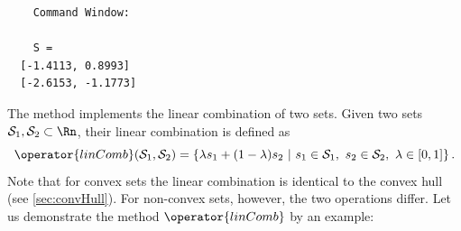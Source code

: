 \begin{center}
\begin{minipage}[t]{0.40\textwidth}
	\vspace{10pt}
	\footnotesize
	
\end{minipage}
\begin{minipage}[t]{0.25\textwidth}
	\vspace{10pt}

	\begin{verbatim}
	Command Window:
		
	S = 
  [-1.4113, 0.8993]
  [-2.6153, -1.1773]
	\end{verbatim}
\end{minipage}
\begin{minipage}[t]{0.3\textwidth}
	\vspace{0pt}
	\centering
\end{minipage}
\end{center}

\vspace{1cm}

\label{sec:linComb}

The method  implements the linear combination of two sets. Given two sets $\mathcal{S}_1,\mathcal{S}_2 \subset \Rn$, their linear combination is defined as 
\begin{equation*}
	\operator{linComb}(\mathcal{S}_1,\mathcal{S}_2) = \left \{ \lambda s_1 + (1-\lambda) s_2 ~|~ s_1 \in \mathcal{S}_1,~s_2 \in \mathcal{S}_2,~\lambda \in [0,1] \right\}.
\end{equation*}
Note that for convex sets the linear combination is identical to the convex hull (see \cref{sec:convHull}). For non-convex sets, however, the two operations differ.
Let us demonstrate the method $\operator{linComb}$ by an example:

\begin{center}
\begin{minipage}[t]{0.38\textwidth}
	\vspace{10pt}
	\footnotesize
	
\end{minipage}
\begin{minipage}[t]{0.6\textwidth}
	\vspace{0pt}
	\centering
\end{minipage}
\end{center}

